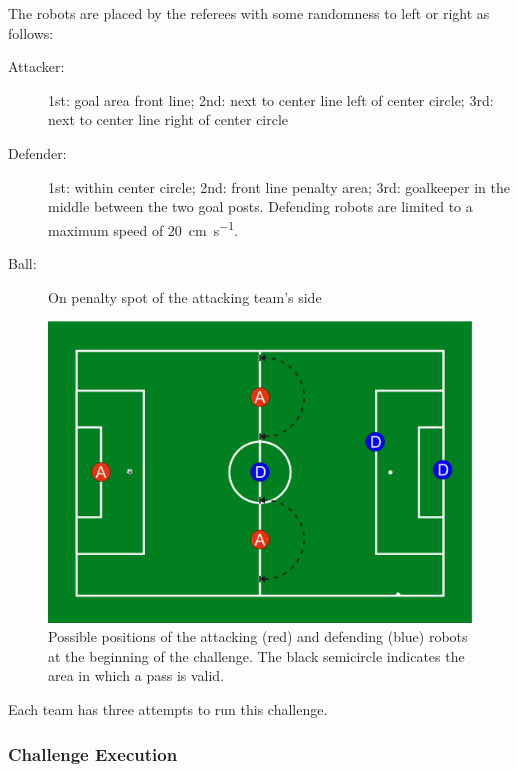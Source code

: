        The robots are placed by the referees with some randomness to left or right as follows:

        \begin{description}
            \item[Attacker:] 1st: goal area front line; 2nd: next to center line left of center circle; 3rd: next to center line right of center circle
            \item[Defender:] 1st: within center circle; 2nd: front line penalty area; 3rd: goalkeeper in the middle between the two goal posts. Defending robots are limited to a maximum speed of \qty{20}{\cm \per \second}.
            \item[Ball:] On penalty spot of the attacking team's side
        \end{description}

        \begin{figure}[t!]
            \begin{center}
                \leavevmode
                \includegraphics[width=1\columnwidth]{figs/ball_handling_positions.pdf}
                \caption{Possible positions of the attacking (red) and defending (blue) robots at the beginning of the challenge. The black semicircle indicates the area in which a pass is valid.}
                \label{fig:ball_handling_positions}
            \end{center}
        \end{figure}

    Each team has three attempts to run this challenge.

    \subsubsection{Challenge Execution}

